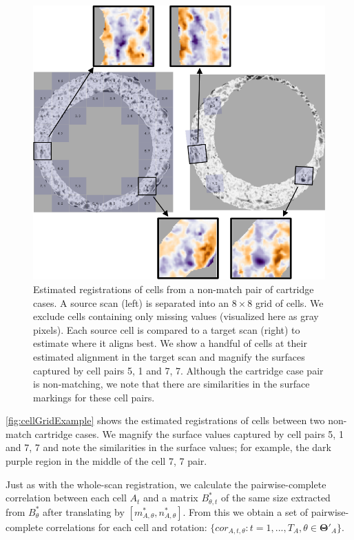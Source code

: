 \documentclass[preprint]{JASA}
\begin{document}
\begin{figure}[htbp]
\includegraphics[width=\textwidth]{images/cellGridExample_nonMatch} \caption{\label{fig:cellGridExample} Estimated registrations of cells from a non-match pair of cartridge cases. A source scan (left) is separated into an $8 \times 8$ grid of cells. We exclude cells containing only missing values (visualized here as gray pixels). Each source cell is compared to a target scan (right) to estimate where it aligns best. We show a handful of cells at their estimated alignment in the target scan and magnify the surfaces captured by cell pairs 5, 1 and 7, 7. Although the cartridge case pair is non-matching, we note that there are similarities in the surface markings for these cell pairs.}\label{fig:unnamed-chunk-6}
\end{figure}

\autoref{fig:cellGridExample} shows the estimated registrations of cells
between two non-match cartridge cases. We magnify the surface values
captured by cell pairs 5, 1 and 7, 7 and note the similarities in the
surface values; for example, the dark purple region in the middle of the
cell 7, 7 pair.

Just as with the whole-scan registration, we calculate the
pairwise-complete correlation between each cell \(A_t\) and a matrix
\(B_{\theta,t}^*\) of the same size extracted from \(B^*_{\theta}\)
after translating by \([m^*_{A,\theta},n^*_{A,\theta}]\). From this we
obtain a set of pairwise-complete correlations for each cell and
rotation:
\(\{cor_{A,t,\theta} : t = 1,...,T_A, \theta \in \pmb{\Theta}'_A\}\).
\end{document}
